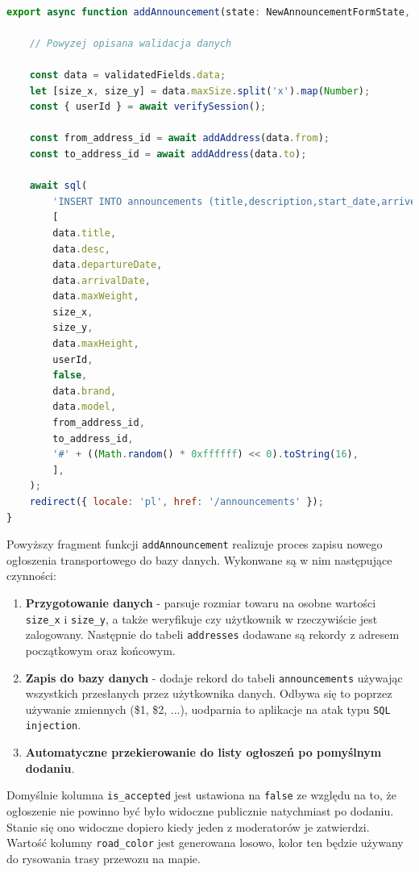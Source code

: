 {\belowcaptionskip=-9pt
\begin{lstlisting}[language=JavaScript,caption=Implementacja dodawania ogłoszenia do bazy danych, label=lst:addAnnouncementToDB]

export async function addAnnouncement(state: NewAnnouncementFormState, formData: FormData) {
    
    // Powyzej opisana walidacja danych

    const data = validatedFields.data;
    let [size_x, size_y] = data.maxSize.split('x').map(Number);
    const { userId } = await verifySession();
    
    const from_address_id = await addAddress(data.from);
    const to_address_id = await addAddress(data.to);
    
    await sql(
        'INSERT INTO announcements (title,description,start_date,arrive_date,max_weight,size_x,size_y,max_height,author_id,is_accepted,vehicle_brand,vehicle_model,from_address_id,to_address_id,road_color)VALUES($1,$2,$3,$4,$5,$6,$7,$8,$9,$10,$11,$12,$13,$14,$15)',
        [
        data.title,
        data.desc,
        data.departureDate,
        data.arrivalDate,
        data.maxWeight,
        size_x,
        size_y,
        data.maxHeight,
        userId,
        false,
        data.brand,
        data.model,
        from_address_id,
        to_address_id,
        '#' + ((Math.random() * 0xffffff) << 0).toString(16),
        ],
    );
    redirect({ locale: 'pl', href: '/announcements' });
}
\end{lstlisting}
}

\pagebreak
Powyższy fragment funkcji \texttt{addAnnouncement} realizuje proces zapisu nowego ogłoszenia transportowego do bazy danych. Wykonwane są w nim następujące czynności:
\begin{enumerate}
    \item \textbf{Przygotowanie danych} - parsuje rozmiar towaru na osobne wartości \texttt{size\_x} i \texttt{size\_y}, a także weryfikuje czy użytkownik w rzeczywiście jest zalogowany. Następnie do tabeli \texttt{addresses} dodawane są rekordy z adresem początkowym oraz końcowym.
    \item \textbf{Zapis do bazy danych} - dodaje rekord do tabeli \texttt{announcements} używając wszystkich przesłanych przez użytkownika danych. Odbywa się to poprzez używanie zmiennych (\$1, \$2, ...), uodparnia to aplikacje na atak typu \texttt{SQL injection}.
    \item \textbf{Automatyczne przekierowanie do listy ogłoszeń po pomyślnym dodaniu}.
\end{enumerate}
Domyślnie kolumna \texttt{is\_accepted} jest ustawiona na \texttt{false} ze względu na to, że ogłoszenie nie powinno być było widoczne publicznie natychmiast po dodaniu. Stanie się ono widoczne dopiero kiedy jeden z moderatorów je zatwierdzi. Wartość kolumny \texttt{road\_color} jest generowana losowo, kolor ten będzie używany do rysowania trasy przewozu na mapie.

